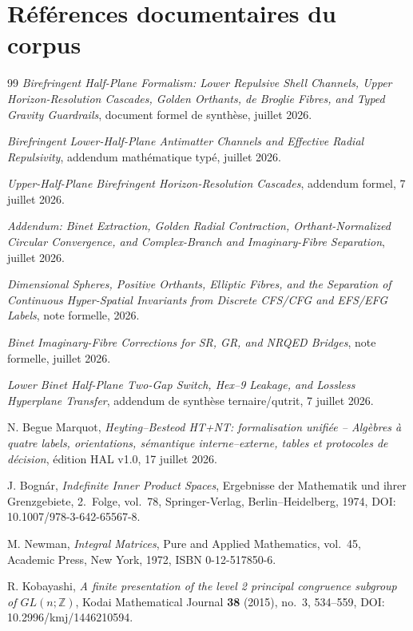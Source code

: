 \documentclass[11pt,a4paper]{article}
\begin{document}
\section{Références documentaires du corpus}
\begin{thebibliography}{99}
\emph{Birefringent Half-Plane Formalism: Lower Repulsive Shell Channels, Upper Horizon-Resolution Cascades, Golden Orthants, de Broglie Fibres, and Typed Gravity Guardrails}, document formel de synthèse, juillet 2026.

\emph{Birefringent Lower-Half-Plane Antimatter Channels and Effective Radial Repulsivity}, addendum mathématique typé, juillet 2026.

\emph{Upper-Half-Plane Birefringent Horizon-Resolution Cascades}, addendum formel, 7 juillet 2026.

\emph{Addendum: Binet Extraction, Golden Radial Contraction, Orthant-Normalized Circular Convergence, and Complex-Branch and Imaginary-Fibre Separation}, juillet 2026.

\emph{Dimensional Spheres, Positive Orthants, Elliptic Fibres, and the Separation of Continuous Hyper-Spatial Invariants from Discrete CFS/CFG and EFS/EFG Labels}, note formelle, 2026.

\emph{Binet Imaginary-Fibre Corrections for SR, GR, and NRQED Bridges}, note formelle, juillet 2026.

\emph{Lower Binet Half-Plane Two-Gap Switch, Hex--9 Leakage, and Lossless Hyperplane Transfer}, addendum de synthèse ternaire/qutrit, 7 juillet 2026.

N. Begue Marquot, \emph{Heyting--Besteod HT+NT: formalisation unifiée -- Algèbres à quatre labels, orientations, sémantique interne--externe, tables et protocoles de décision}, édition HAL v1.0, 17 juillet 2026.

J. Bognár, \emph{Indefinite Inner Product Spaces}, Ergebnisse der Mathematik und ihrer Grenzgebiete, 2.~Folge, vol.~78, Springer-Verlag, Berlin--Heidelberg, 1974, DOI: 10.1007/978-3-642-65567-8.

M. Newman, \emph{Integral Matrices}, Pure and Applied Mathematics, vol.~45, Academic Press, New York, 1972, ISBN 0-12-517850-6.

R. Kobayashi, \emph{A finite presentation of the level 2 principal congruence subgroup of $GL(n;\mathbb Z)$},
Kodai Mathematical Journal \textbf{38} (2015), no.~3, 534--559, DOI: 10.2996/kmj/1446210594.


\end{thebibliography}
\end{document}
